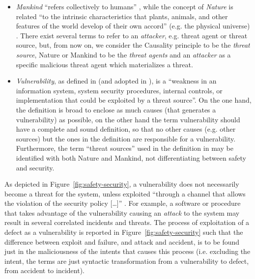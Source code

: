 \documentclass[conference]{IEEEtran}
\begin{document}
\begin{itemize}
	\item \emph{Mankind} ``refers collectively to humans''
		\autocite{wiki-mankind}, while the concept of \emph{Nature} is
		related ``to the intrinsic characteristics that plants,
		animals, and other features of the world develop of their own
		accord'' (e.g. the physical universe) \autocite{wiki-nature}.
		There exist several terms to refer to an \emph{attacker}, e.g.
		threat agent or threat source, but, from now on, we consider
		the Causality principle to be the \emph{threat source}, Nature
		or Mankind to be the \emph{threat agents} and an
		\emph{attacker} as a specific malicious threat agent which
		materializes a threat.
	\item \emph{Vulnerability},
		as defined in \autocite{cnssi20104009}
		(and adopted in \autocite{nist2013800-53}), is a ``weakness in an
		information system, system security procedures, internal
		controls, or implementation that could be exploited by a threat
		source''. On the one hand, the definition is broad to enclose
		as much causes (that generates a vulnerability) as possible,
		on the other hand the term vulnerability should have a complete and sound
		definition, so that no other causes (e.g.  other sources) but
		the ones in the definition are responsible for a vulnerability.
		Furthermore, the term ``threat sources'' used in the definition
		in \autocite{cnssi20104009} may be identified with both Nature
		and Mankind, not differentiating between safety and security.
\end{itemize}

As depicted in Figure~\ref{fig:safety-security}, a vulnerability does not
necessarily become a threat for the system, unless exploited ``through a
channel that allows the violation of the security policy
[\ldots]'' \autocite{cnssi20104009}. For example, a software or procedure that takes
advantage of the vulnerability causing an \emph{attack} to the system may
result in several correlated incidents and threats.  The process of
exploitation of a defect as a vulnerability is reported in
Figure~\ref{fig:safety-security} such that the difference between exploit and failure,
and attack and accident, is to be found just in the maliciousness of the intents
that causes this process (i.e. excluding the intent, the terms are just syntactic transformation from a vulnerability to defect, from
accident to incident). 
\end{document}
